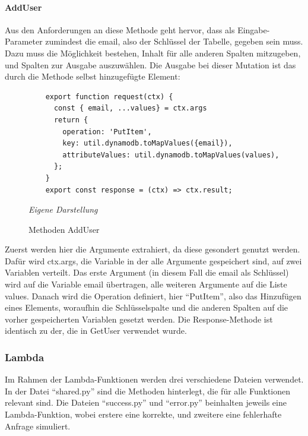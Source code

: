 \paragraph {AddUser}
Aus den Anforderungen an diese Methode geht hervor, dass als Eingabe-Parameter zumindest die email, also der Schlüssel der Tabelle, gegeben sein muss. Dazu muss die Möglichkeit bestehen, Inhalt für alle anderen Spalten mitzugeben, und Spalten zur Ausgabe auszuwählen. Die Ausgabe bei dieser Mutation ist das durch die Methode selbst hinzugefügte Element:
	\begin{figure}[H]
	\centering
	\begin{minipage}[t]{.7\textwidth} %
	\caption{Methoden AddUser} %
	\begin{verbatim}
	export function request(ctx) {
	  const { email, ...values} = ctx.args
	  return {
	    operation: 'PutItem',
	    key: util.dynamodb.toMapValues({email}),
	    attributeValues: util.dynamodb.toMapValues(values),
	  };
	}
	export const response = (ctx) => ctx.result;
	\end{verbatim}
	
	\textit{Eigene Darstellung} %
	\label{fig:addUserMethoden}
	\end{minipage}
	\end{figure}
Zuerst werden hier die Argumente extrahiert, da diese gesondert genutzt werden. Dafür wird ctx.args, die Variable in der alle Argumente gespeichert sind, auf zwei Variablen verteilt. Das erste Argument (in diesem Fall die email als Schlüssel) wird auf die Variable email übertragen, alle weiteren Argumente auf die Liste values. Danach wird die Operation definiert, hier ``PutItem'', also das Hinzufügen eines Elements, woraufhin die Schlüsselspalte und die anderen Spalten auf die vorher gespeicherten Variablen gesetzt werden. Die Response-Methode ist identisch zu der, die in GetUser verwendet wurde.

\subsubsection{Lambda}
Im Rahmen der Lambda-Funktionen werden drei verschiedene Dateien verwendet. In der Datei ``shared.py'' sind die Methoden hinterlegt, die für alle Funktionen relevant sind. Die Dateien ``success.py'' und ``error.py'' beinhalten jeweils eine Lambda-Funktion, wobei erstere eine korrekte, und zweitere eine fehlerhafte Anfrage simuliert. 
